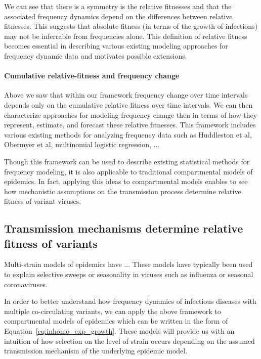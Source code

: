 \documentclass[12pt,oneside,letterpaper]{article}
\begin{document}
We can see that there is a symmetry is the relative fitnesses and that the associated frequency dynamics depend on the differences between relative fitnesses.
This suggests that absolute fitness (in terms of the growth of infections) may not be inferrable from frequencies alone.
This definition of relative fitness becomes essential in describing various existing modeling approaches for frequency dynamic data and motivates possible extensions.

\paragraph{Cumulative relative-fitness and frequency change}

Above we saw that within our framework frequency change over time intervals depends only on the cumulative relative fitness over time intervals.
We can then characterize approaches for modeling frequency change then in terms of how they represent, estimate, and forecast these relative fitnesses.
This framework includes various existing methods for analyzing frequency data such as Huddleston et al, Obermyer et al, multinomial logistic regression, ...  %


Though this framework can be used to describe existing statistical methods for frequency modeling, it is also applicable to traditional compartmental models of epidemics.
In fact, applying this ideas to compartmental models enables to see how mechanistic assumptions on the transmission process determine relative fitness of variant viruses.

\subsection*{Transmission mechanisms determine relative fitness of variants}

Multi-strain models of epidemics have ... %
These models have typically been used to explain selective sweeps or seasonality in viruses such as influenza or seasonal coronaviruses.

In order to better understand how frequency dynamics of infectious diseases with multiple co-circulating variants, we can apply the above framework to compartmental models of epidemics which can be written in the form of Equation~\ref{eq:inhomo_exp_growth}.
These models will provide us with an intuition of how selection on the level of strain occurs depending on the assumed transmission mechanism of the underlying epidemic model.
\end{document}
